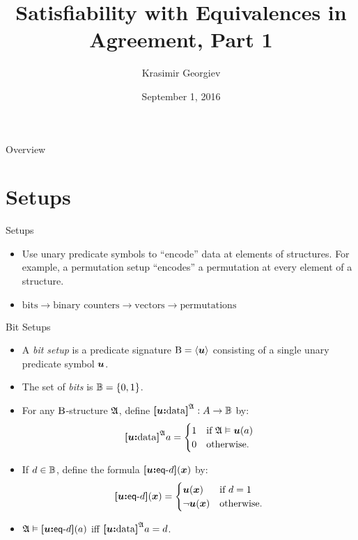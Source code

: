 \documentclass{beamer}
\begin{document}
\title{Satisfiability with Equivalences in Agreement, Part 1}
\author{Krasimir Georgiev}
\date{September 1, 2016}
\frame{\titlepage}

\begin{frame}{Overview}
\tableofcontents
\end{frame}

\section{Setups}
\begin{frame}{Setups}
\begin{itemize}
\item Use unary predicate symbols to ``encode'' data at elements of structures.
For example, a permutation setup ``encodes'' a permutation at every element of a
structure.
\item $\text{bits} \to \text{binary counters} \to \text{vectors} \to
\text{permutations}$
\end{itemize}
\end{frame}

\begin{frame}{Bit Setups}
\begin{itemize}
  \item A \emph{bit setup} is a predicate signature ${\mathrm{B}} = \left\langle \bm{u} \right\rangle$ consisting of a
  single unary predicate symbol $\bm{u}$.
  \item The set of \emph{bits} is $\mathbb{B} = \left\{0,1\right\}$.
  \item For any ${\mathrm{B}}$-structure $\mathfrak{A}$, define ${\bm{[}\bm{u}\mathord{\bm{:}}\mathrm{data}\bm{]}}^{\mathfrak{A}} : A\to\mathbb{B}$ by:
  \[
    {\bm{[}\bm{u}\mathord{\bm{:}}\mathrm{data}\bm{]}}^{\mathfrak{A}} a = \begin{cases}
      1 &\text{if } \mathfrak{A} \vDash \bm{u}(a) \\
      0 &\text{otherwise.}
    \end{cases}
  \]

  \item
  If $d\in\mathbb{B}$, define the formula ${\bm{[}\bm{u}\mathord{\bm{:}}\mathsf{eq}{\hbox{-}}d\bm{]}}(\bm{x})$ by:
  \[
  {\bm{[}\bm{u}\mathord{\bm{:}}\mathsf{eq}{\hbox{-}}d\bm{]}}(\bm{x}) = \begin{cases}
    \bm{u}(\bm{x}) &\text{if } d = 1 \\
    \lnot\bm{u}(\bm{x}) &\text{otherwise.}
  \end{cases}
  \]

  \item $\mathfrak{A}\vDash{\bm{[}\bm{u}\mathord{\bm{:}}\mathsf{eq}{\hbox{-}}d\bm{]}}(a)$ iff ${\bm{[}\bm{u}\mathord{\bm{:}}\mathrm{data}\bm{]}}^{\mathfrak{A}}a = d$.
\end{itemize}
\end{frame}
\end{document}

